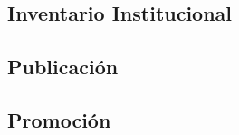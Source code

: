 \documentclass[
10pt, %
letterpaper, %
oneside, %
headinclude,footinclude, %
BCOR5mm, %
]{scrartcl}
\begin{document}
\subsection{Inventario Institucional}
\cite{_nih_????}

\subsection{Publicación}


\subsection{Promoción}
\cite{schofield_post-publication_2009}



\renewcommand{\refname}{\spacedlowsmallcaps{References}} %



%


\end{document}
